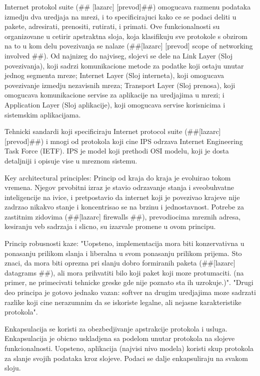 \documentclass[a4paper,12pt, master]{etf}
\begin{document}
	Internet protokol suite (\#\# [lazarc] [prevod]\#\#) omogucava razmenu podataka izmedju dva
	uredjaja na mrezi, i to specificirajuci kako ce se podaci deliti u pakete, adresirati,
	prenositi, rutirati, i primati. Ove funkcionalnosti su organizovane u cetirir apstraktna 
	sloja, koja klasifikuju sve protokole s obzirom na to u kom delu povezivanja se nalaze 
	(\#\#[lazarc] [prevod] scope of networking involved \#\#). Od najnizeg do najviseg, 
	slojevi se dele na Link	Layer (Sloj povezivanja), koji sadrzi komunikacione metode za 
	podatke koji ostaju unutar jednog segmenta mreze; Internet Layer (Sloj interneta), koji 
	omogucava povezivanje izmedju nezavisnih mreza; Transport Layer (Sloj prenosa), koji 
	omogucava komunikacione servise za aplikacije na uredjajima u mrezi; i Application Layer 
	(Sloj aplikacije), koji omogucava servise korisnicima i	sistemskim aplikacijama.

	Tehnicki sandardi koji specificiraju Internet protocol suite (\#\#[lazarc] [prevod]\#\#) i 
	mnogi od protokola koji cine IPS odrzava Internet Engineering Task Force (IETF). IPS je 
	model koji prethodi OSI modelu, koji je dosta detaljniji i opisuje vise u mreznom sistemu.

	Key architectural principles:
	Princip od kraja do kraja je evoluirao tokom vremena. Njegov prvobitni izraz je stavio 
	odrzavanje stanja i sveobuhvatne inteligencije na ivice, i pretpostavio da internet koji je 
	povezivao krajeve nije zadrzao nikakvo stanje i koncentrisao se na brzinu i jednostavnost. 
	Potrebe za zastitnim zidovima (\#\#[lazarc] firewalls \#\#), prevodiocima mreznih adresa, 
	kesiranju veb sadrzaja i slicno, su izazvale promene u ovom principu.

	Princip robusnosti kaze: "Uopsteno, implementacija mora biti konzervativna u ponasanju 
	prilikom slanja i liberalna u svom ponasanju prilikom prijema. Sto znaci, da mora biti 
	oprezna pri slanju dobro formiranih paketa (\#\#[lazarc] datagrams \#\#), ali mora 
	prihvatiti bilo koji paket koji moze protumaciti. (na primer, ne primecivati tehnicke greske 
	gde nije poznato sta ih uzrokuje.)". "Drugi deo principa je gotovo jednako vazan: softver na 
	drugim uredjajima moze sadrzati razlike koji cine nerazumnim da se iskoriste legalne, ali 
	nejasne karakteristike protokola".

	Enkapsulacija se koristi za obezbedjivanje apstrakcije protokola i usluga. Enkapsulacija je 
	obicno uskladjena sa podelom unutar protokola na slojeve funkcionalnosti. Uopsteno, 
	aplikacija (najvisi nivo modela) koristi skup protokola za slanje svojih podataka kroz 
	slojeve. Podaci se dalje enkapsuliraju na svakom sloju.
\end{document}
